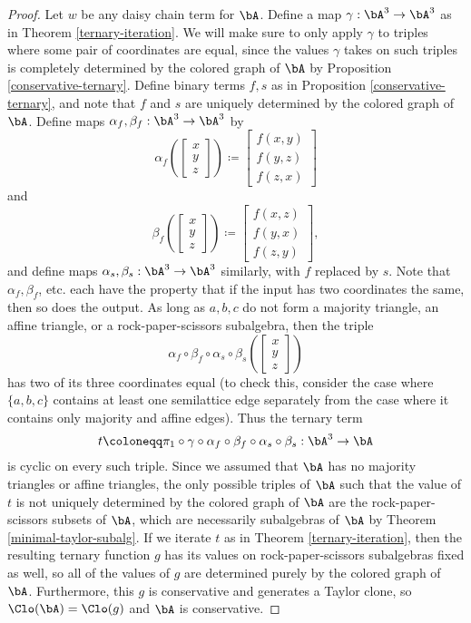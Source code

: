 \begin{proof} Let $w$ be any daisy chain term for $\bA$. Define a map $\gamma : \bA^3 \rightarrow \bA^3$ as in Theorem \ref{ternary-iteration}. We will make sure to only apply $\gamma$ to triples where some pair of coordinates are equal, since the values $\gamma$ takes on such triples is completely determined by the colored graph of $\bA$ by Proposition \ref{conservative-ternary}. Define binary terms $f,s$ as in Proposition \ref{conservative-ternary}, and note that $f$ and $s$ are uniquely determined by the colored graph of $\bA$. Define maps $\alpha_f, \beta_f: \bA^3 \rightarrow \bA^3$ by
\[
\alpha_f\left(\begin{bmatrix}x\\ y\\ z\end{bmatrix}\right) \coloneqq \begin{bmatrix}f(x,y)\\ f(y,z)\\ f(z,x)\end{bmatrix}
\]
and
\[
\beta_f\left(\begin{bmatrix}x\\ y\\ z\end{bmatrix}\right) \coloneqq \begin{bmatrix}f(x,z)\\ f(y,x)\\ f(z,y)\end{bmatrix},
\]
and define maps $\alpha_s, \beta_s: \bA^3 \rightarrow \bA^3$ similarly, with $f$ replaced by $s$. Note that $\alpha_f, \beta_f$, etc. each have the property that if the input has two coordinates the same, then so does the output. As long as $a,b,c$ do not form a majority triangle, an affine triangle, or a rock-paper-scissors subalgebra, then the triple
\[
\alpha_f\circ\beta_f\circ\alpha_s\circ\beta_s\left(\begin{bmatrix}x\\ y\\ z\end{bmatrix}\right)
\]
has two of its three coordinates equal (to check this, consider the case where $\{a,b,c\}$ contains at least one semilattice edge separately from the case where it contains only majority and affine edges). Thus the ternary term
\[
t \coloneqq \pi_1\circ\gamma\circ\alpha_f\circ\beta_f\circ\alpha_s\circ\beta_s : \bA^3 \rightarrow \bA
\]
is cyclic on every such triple. Since we assumed that $\bA$ has no majority triangles or affine triangles, the only possible triples of $\bA$ such that the value of $t$ is not uniquely determined by the colored graph of $\bA$ are the rock-paper-scissors subsets of $\bA$, which are necessarily subalgebras of $\bA$ by Theorem \ref{minimal-taylor-subalg}. If we iterate $t$ as in Theorem \ref{ternary-iteration}, then the resulting ternary function $g$ has its values on rock-paper-scissors subalgebras fixed as well, so all of the values of $g$ are determined purely by the colored graph of $\bA$. Furthermore, this $g$ is conservative and generates a Taylor clone, so $\Clo(\bA) = \Clo(g)$ and $\bA$ is conservative.
\end{proof}

